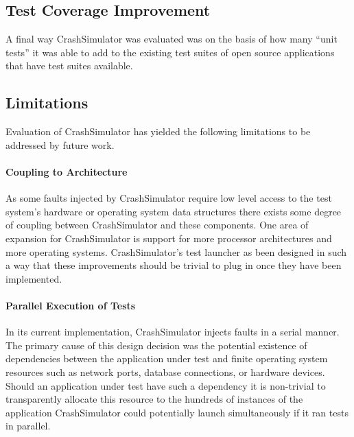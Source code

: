     \subsection{Test Coverage Improvement}

        A final way CrashSimulator was evaluated was on the basis of how many ``unit tests'' it was able to add to the
        existing test suites of open source applications that have test suites available.

    \subsection{Limitations}

        Evaluation of CrashSimulator has yielded the following limitations to be addressed by future work.

        \paragraph{Coupling to Architecture}

            As some faults injected by CrashSimulator require low level access to the test system's hardware or
            operating system data structures there exists some degree of coupling between CrashSimulator and these
            components. One area of expansion for CrashSimulator is support for more processor architectures and more
            operating systems.  CrashSimulator's test launcher as been designed in such a way that these improvements
            should be trivial to plug in once they have been implemented.

        \paragraph{Parallel Execution of Tests}

            In its current implementation, CrashSimulator injects faults in a serial manner. The primary cause of this
            design decision was the potential existence of dependencies between the application under test and finite
            operating system resources such as network ports, database connections, or hardware devices. Should an
            application under test have such a dependency it is non-trivial to transparently allocate this resource to
            the hundreds of instances of the application CrashSimulator could potentially launch simultaneously if it
            ran tests in parallel.

